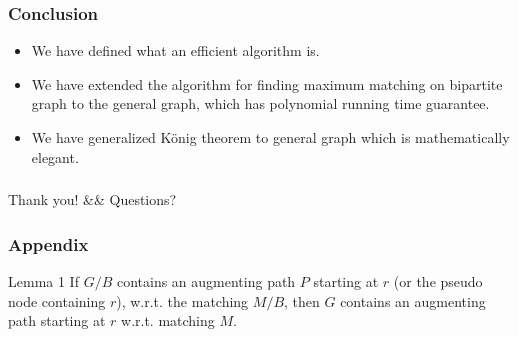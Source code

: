 \documentclass[hyperref={pdfpagelabels=false}]{beamer}
\begin{document}
\frame
{
	\frametitle{Conclusion}
	\begin{itemize}
		\item We have defined what an efficient algorithm is.
		\item We have extended the algorithm for finding maximum matching on bipartite graph to the general graph, which has polynomial running time guarantee.
		\item We have generalized K\"{o}nig theorem to general graph which is mathematically elegant.
	\end{itemize}
}

\frame
{
	\frametitle{ }
	
	\begin{center}
	\huge{Thank you! \&\& Questions?}
	\end{center}
	
}

\frame
{
	\frametitle{Appendix}
	
	\begin{block}{Lemma 1}
	If $G/B$ contains an augmenting path $P$ starting at $r$ (or the pseudo node containing $r$), w.r.t. the matching $M/B$, then $G$ contains an augmenting path starting at $r$ w.r.t. matching $M$.
	\end{block}
	
}
\end{document}
